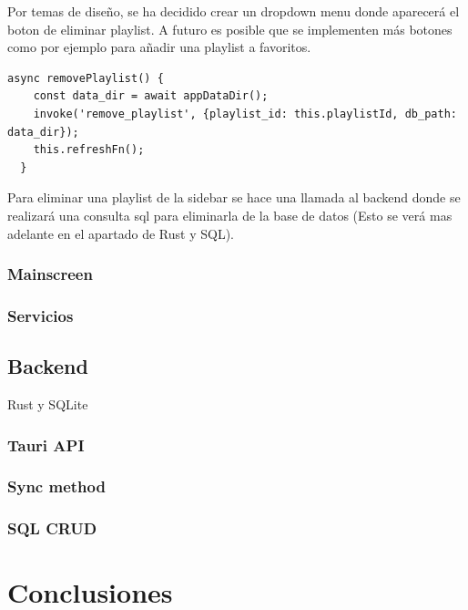 \documentclass[11pt, a4paper]{article}
\begin{document}
                Por temas de diseño, se ha decidido crear un dropdown menu donde aparecerá el boton de eliminar playlist. A futuro es posible que se implementen más botones como por ejemplo para añadir una playlist a favoritos.

                \begin{lstlisting}[caption={removePlaylist()}]
async removePlaylist() {
    const data_dir = await appDataDir();
    invoke('remove_playlist', {playlist_id: this.playlistId, db_path: data_dir});
    this.refreshFn();
  }
                \end{lstlisting}

                Para eliminar una playlist de la sidebar se hace una llamada al backend donde se realizará una consulta sql para eliminarla de la base de datos (Esto se verá mas adelante en el apartado de Rust y SQL).

            \subsubsection{Mainscreen}

            \subsubsection{Servicios}

        \subsection{Backend}

        Rust y SQLite

            \subsubsection{Tauri API}

            \subsubsection{Sync method}

            \subsubsection{SQL CRUD}


\section{Conclusiones}
\end{document}
